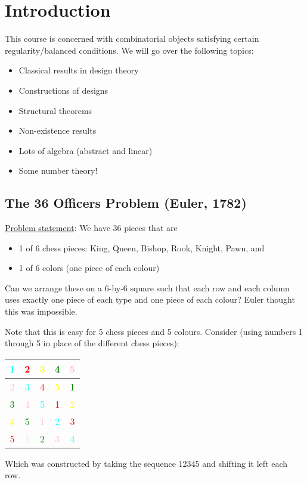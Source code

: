 \section{Introduction}

This course is concerned with combinatorial objects satisfying certain regularity/balanced conditions.
We will go over the following topics:
\begin{itemize}
    \item Classical results in design theory
    \item Constructions of designs
    \item Structural theorems
    \item Non-existence results
    \item Lots of algebra (abstract and linear)
    \item Some number theory!
\end{itemize}

\subsection{The 36 Officers Problem (Euler, 1782)}
\ul{Problem statement}: We have 36 pieces that are 
\begin{itemize}
    \item 1 of 6 chess pieces: King, Queen, Bishop, Rook, Knight, Pawn, and
    \item 1 of 6 colors (one piece of each colour)
\end{itemize}

Can we arrange these on a 6-by-6 square such that each row and each column uses exactly one piece of each type and one piece of each colour?
Euler thought this was impossible.

Note that this is easy for 5 chess pieces and 5 colours.
Consider (using numbers 1 through 5 in place of the different chess pieces):
\begin{center}
    \begin{tabular}{|c|c|c|c|c|}
        \hline
        \textcolor{cyan}{1} & \textcolor{red}{2} & \textcolor{yellow}{3} & \textcolor{green}{4} & \textcolor{pink}{5} \\
        \hline
        \textcolor{pink}{2} & \textcolor{cyan}{3} & \textcolor{red}{4} & \textcolor{yellow}{5} & \textcolor{green}{1} \\ 
        \hline
        \textcolor{green}{3} & \textcolor{pink}{4} & \textcolor{cyan}{5} & \textcolor{red}{1} & \textcolor{yellow}{2} \\ 
        \hline
        \textcolor{yellow}{4} & \textcolor{green}{5} & \textcolor{pink}{1} & \textcolor{cyan}{2} & \textcolor{red}{3} \\ 
        \hline
        \textcolor{red}{5} & \textcolor{yellow}{1} & \textcolor{green}{2} & \textcolor{pink}{3} & \textcolor{cyan}{4} \\ 
        \hline
    \end{tabular}
\end{center}
Which was constructed by taking the sequence 12345 and shifting it left each row.

